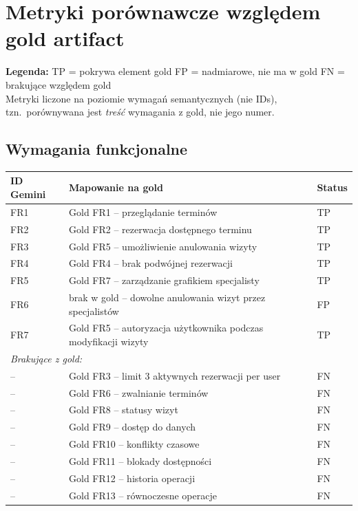 \documentclass[12pt,a4paper]{article}
\newcommand{\tp}[1]{\colorbox{tpcolor}{\small #1}}
\newcommand{\fp}[1]{\colorbox{fpcolor}{\small #1}}
\newcommand{\fn}[1]{\colorbox{fncolor}{\small #1}}
\begin{document}
\newpage

\section{Metryki porównawcze względem gold artifact}

\begin{mdframed}[backgroundcolor=metabg, linewidth=0pt, innerleftmargin=10pt, innerrightmargin=10pt, innertopmargin=8pt, innerbottommargin=8pt]
\small
\textbf{Legenda:} \tp{TP} = pokrywa element gold \quad \fp{FP} = nadmiarowe, nie ma w gold \quad \fn{FN} = brakujące względem gold\\[0.3em]
Metryki liczone na poziomie wymagań semantycznych (nie IDs), tzn.\ porównywana jest \textit{treść} wymagania z gold, nie jego numer.
\end{mdframed}

\vspace{0.8em}

\subsection{Wymagania funkcjonalne}

\begin{tabular}{p{2.5cm} p{7cm} l}
\toprule
\textbf{ID Gemini} & \textbf{Mapowanie na gold} & \textbf{Status} \\
\midrule
FR1 & Gold FR1 -- przeglądanie terminów & \tp{TP} \\
FR2 & Gold FR2 -- rezerwacja dostępnego terminu & \tp{TP} \\
FR3 & Gold FR5 -- umożliwienie anulowania wizyty & \tp{TP} \\
FR4 & Gold FR4 -- brak podwójnej rezerwacji & \tp{TP} \\
FR5 & Gold FR7 -- zarządzanie grafikiem specjalisty & \tp{TP} \\
FR6 & brak w gold -- dowolne anulowania wizyt przez specjalistów & \fp{FP} \\
FR7 & Gold FR5 -- autoryzacja użytkownika podczas modyfikacji wizyty & \tp{TP} \\
\midrule
\multicolumn{3}{l}{\textit{Brakujące z gold:}} \\
-- & Gold FR3 -- limit 3 aktywnych rezerwacji per user & \fn{FN} \\
-- & Gold FR6 -- zwalnianie terminów & \fn{FN} \\
-- & Gold FR8 -- statusy wizyt & \fn{FN} \\
-- & Gold FR9 -- dostęp do danych & \fn{FN} \\
-- & Gold FR10 -- konflikty czasowe & \fn{FN} \\
-- & Gold FR11 -- blokady dostępności & \fn{FN} \\
-- & Gold FR12 -- historia operacji & \fn{FN} \\
-- & Gold FR13 -- równoczesne operacje & \fn{FN} \\
\bottomrule
\end{tabular}
\end{document}
